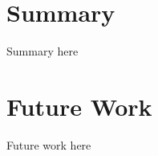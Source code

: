 \documentclass[../main.tex]{subfiles}
\begin{document}
\section{Summary}

Summary here

\section{Future Work}

Future work here
\end{document}
